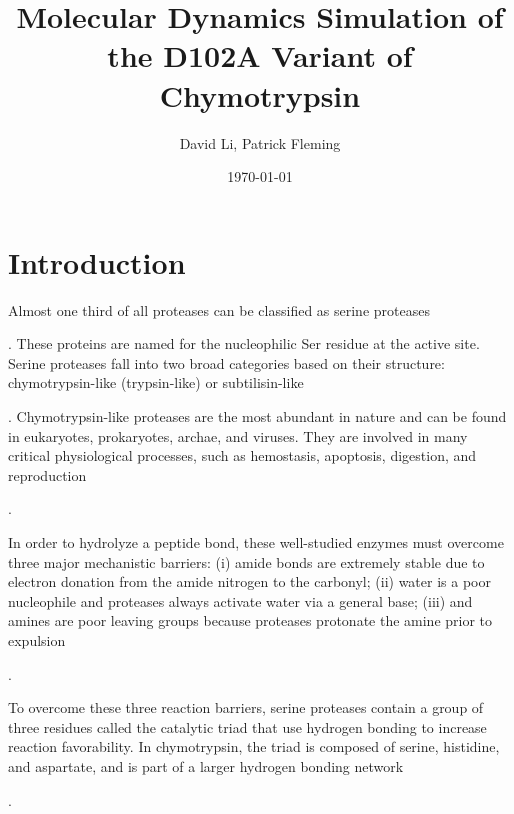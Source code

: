 \documentclass[12pt, twocolumn]{article}
\newcommand*{\nolink}[1]{%
\begin{NoHyper}#1\end{NoHyper}%
}
\begin{document}
\title{Molecular Dynamics Simulation of the D102A Variant of Chymotrypsin}
\author{David Li, Patrick Fleming}
\date{\today}
\maketitle

\section{Introduction}
Almost one third of all proteases can be classified as serine proteases
~\nolink{\cite{hedstrom02}}. These proteins are named for the nucleophilic Ser
residue at the active site. Serine proteases fall into two broad categories
based on their structure: chymotrypsin-like (trypsin-like) or subtilisin-like
~\nolink{\cite{madala10}}. Chymotrypsin-like proteases are the most abundant in
nature and can be found in eukaryotes, prokaryotes, archae, and viruses. They
are involved in many critical physiological processes, such as hemostasis,
apoptosis, digestion, and reproduction~\nolink{\cite{hedstrom02}}.

In order to hydrolyze a peptide bond, these well-studied enzymes must overcome
three major mechanistic barriers: (i) amide bonds are extremely stable due to
electron donation from the amide nitrogen to the carbonyl; (ii) water is a poor
nucleophile and proteases always activate water via a general base; (iii) and
amines are poor leaving groups because proteases protonate the amine prior to
expulsion~\nolink{\cite{hedstrom02}}.

To overcome these three reaction barriers, serine proteases contain a group
of three residues called the catalytic triad that use hydrogen bonding to
increase reaction favorability. In chymotrypsin, the triad is composed of
serine, histidine, and aspartate, and is part of a larger hydrogen bonding
network~\nolink{\cite{hedstrom02}}.
\end{document}
